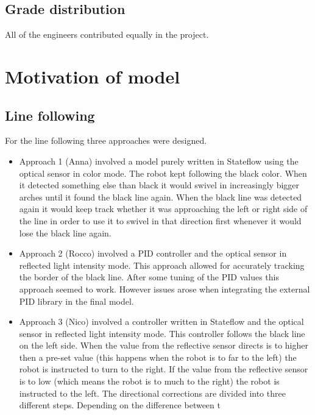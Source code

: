 \documentclass[a4paper,12pt]{article}
\begin{document}
\subsection{Grade distribution}
All of the engineers contributed equally in the project. 
\section{Motivation of model}
\subsection{Line following}
For the line following three approaches were designed. 
\begin{itemize}
    \item Approach 1 (Anna) involved a model purely written in Stateflow using the optical sensor in color mode. The robot kept following the black color. When it detected something else than black it would swivel in increasingly bigger arches until it found the black line again. When the black line was detected again it would keep track whether it was approaching the left or right side of the line in order to use it to swivel in that direction first whenever it would lose the black line again.
    \item Approach 2 (Rocco) involved a PID controller and the optical sensor in reflected light intensity mode. This approach allowed for accurately tracking the border of the black line. After some tuning of the PID values this approach seemed to work. However issues arose when integrating the external PID library in the final model.
    \item Approach 3 (Nico) involved a controller written in Stateflow and the optical sensor in reflected light intensity mode. This controller follows the black line on the left side. When the value from the reflective sensor directs is to higher then a pre-set value (this happens when the robot is to far to the left) the robot is instructed to turn to the right. If the value from the reflective sensor is to low (which means the robot is to much to the right) the robot is instructed to the left. The directional corrections are divided into three different steps. Depending on the difference between t
\end{itemize}
\end{document}
